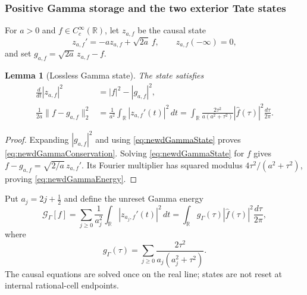 \documentclass[11pt]{amsart}
\newtheorem{lemma}[theorem]{Lemma}
\theoremstyle{definition}
\theoremstyle{remark}
\newcommand{\R}{\mathbb R}
\begin{document}
\subsubsection{Positive Gamma storage and the two exterior Tate states}

For $a>0$ and $f\in C_c^\infty(\R)$, let $z_{a,f}$ be the causal state
\begin{equation}\label{eq:newdGammaState}
 z_{a,f}'=-az_{a,f}+\sqrt{2a}\,f,
 \qquad z_{a,f}(-\infty)=0,
\end{equation}
and set $g_{a,f}=\sqrt{2a}\,z_{a,f}-f$.

\begin{lemma}[Lossless Gamma state]
\label{lem:newdGammaState}
The state satisfies
\begin{align}
 \frac d{dt}|z_{a,f}|^2&=|f|^2-|g_{a,f}|^2,
 \label{eq:newdGammaConservation}\\
 \frac1{2a}\|f-g_{a,f}\|_2^2
 &=\frac1{a^2}\int_\R|z_{a,f}'(t)|^2\,dt
 =\int_\R\frac{2\tau^2}{a(a^2+\tau^2)}
       |\widehat f(\tau)|^2\frac{d\tau}{2\pi}.
 \label{eq:newdGammaEnergy}
\end{align}
\end{lemma}

\begin{proof}
Expanding $|g_{a,f}|^2$ and using
\eqref{eq:newdGammaState} proves
\eqref{eq:newdGammaConservation}.  Solving
\eqref{eq:newdGammaState} for $f$ gives
$f-g_{a,f}=\sqrt{2/a}\,z_{a,f}'$.  Its Fourier multiplier has squared
modulus $4\tau^2/(a^2+\tau^2)$, proving
\eqref{eq:newdGammaEnergy}.
\end{proof}

Put $a_j=2j+\tfrac12$ and define the unreset Gamma energy
\begin{equation}\label{eq:newdFullGammaEnergy}
 \mathcal G_\Gamma[f]
 =\sum_{j\geq0}\frac1{a_j^2}\int_\R|z_{a_j,f}'(t)|^2\,dt
 =\int_\R g_\Gamma(\tau)|\widehat f(\tau)|^2
      \frac{d\tau}{2\pi},
\end{equation}
where
\begin{equation}\label{eq:newdGammaMultiplier}
 g_\Gamma(\tau)=
 \sum_{j\geq0}\frac{2\tau^2}{a_j(a_j^2+\tau^2)}.
\end{equation}
The causal equations are solved once on the real line; states are not reset
at internal rational-cell endpoints.
\end{document}
